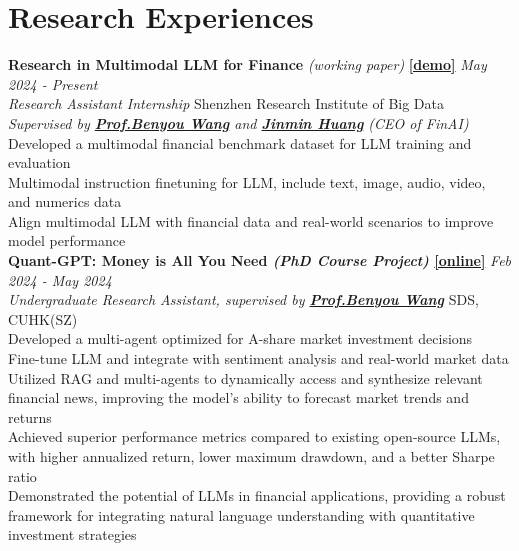 \documentclass[a4paper,8pt]{article}
\begin{document}
\section*{Research Experiences}
\textbf{Research in Multimodal LLM for Finance} \textit{\small (working paper)} \textbf{\href{https://github.com/TobyYang7/Llava_Qwen2}{[demo]}} \hfill \textit{May 2024 - Present}\\
\textit{Research Assistant Internship} \hfill Shenzhen Research Institute of Big Data\\
\textit{Supervised by \textbf{\href{https://wabyking.github.io/old.html}{Prof.\@ Benyou Wang}} and \textbf{\href{https://medicine.yale.edu/profile/jimin-huang/}{Jinmin Huang}} {\small (CEO of FinAI)}} \\
\textbullet Developed a multimodal financial benchmark dataset for LLM training and evaluation\\
\textbullet Multimodal instruction finetuning for LLM, include text, image, audio, video, and numerics data\\
\textbullet Align multimodal LLM with financial data and real-world scenarios to improve model performance\\
\textbf{Quant-GPT: Money is All You Need \textnormal{\small \textit{(PhD Course Project)}} \href{https://github.com/TobyYang7/Quant-GPT}{[online]}} \hfill \textit{Feb 2024 - May 2024}\\
\textit{Undergraduate Research Assistant, supervised by \textbf{\href{https://wabyking.github.io/old.html}{Prof.\@ Benyou Wang}}} \hfill SDS, CUHK(SZ)\\
\textbullet Developed a multi-agent optimized for A-share market investment decisions\\ 
\textbullet Fine-tune LLM and integrate with sentiment analysis and real-world market data\\
\textbullet Utilized RAG and multi-agents to dynamically access and synthesize relevant financial news, improving the model's ability to forecast market trends and returns\\
\textbullet Achieved superior performance metrics compared to existing open-source LLMs, with higher annualized return, lower maximum drawdown, and a better Sharpe ratio\\
\textbullet Demonstrated the potential of LLMs in financial applications, providing a robust framework for integrating natural language understanding with quantitative investment strategies\\
\end{document}
